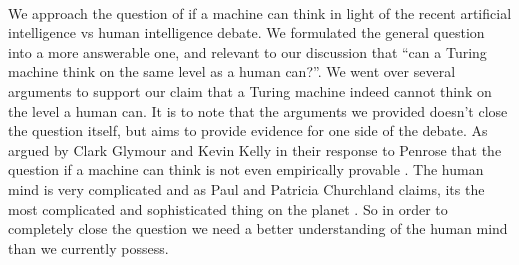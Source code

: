 \documentclass[11pt,a4paper]{article}
\begin{document}
\\\par\vspace*{0.5cm}
We approach the question of if a machine can think in light of the recent artificial intelligence vs human intelligence debate. 
We formulated the general question into a more answerable one, and relevant to our discussion that ``can a Turing machine think on the same level as a human can?''.
We went over several arguments to support our claim that a Turing machine indeed cannot think on the level a human can. 
It is to note that the arguments we provided doesn't close the question itself, but aims to provide evidence for one side of the debate.
As argued by Clark Glymour and Kevin Kelly in their response to Penrose that the question if a machine can think is not even empirically provable \cite{glymour_kelly_1990}. The human mind is very complicated and as Paul and Patricia Churchland claims, its the most complicated and sophisticated thing on the planet \cite{Churchland}.
So in order to completely close the question we need a better understanding of the human mind than we currently possess.

 
 
\end{document}
